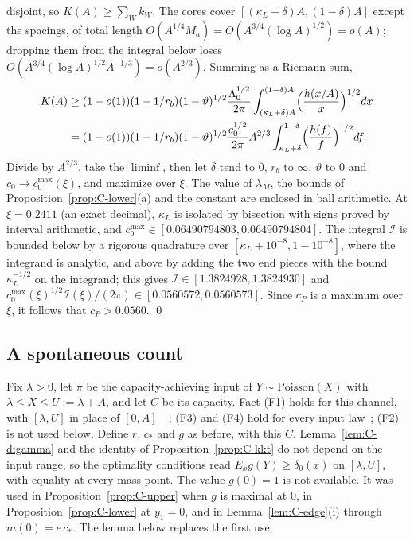 disjoint, so $K(A)\ge\sum_Wk_W$. The cores cover $[(\kappa_L+\delta)A,(1-\delta)A]$ except the spacings, of total length
$O(A^{1/4}M_a)=O(A^{3/4}(\log A)^{1/2})=o(A)$; dropping them from the integral below loses $O(A^{3/4}(\log A)^{1/2}A^{-1/3})=o(A^{2/3})$.
Summing as a Riemann sum,
\begin{align*}
K(A)&\ge(1-o(1))(1-1/r_b)(1-\vartheta)^{1/2}\frac{\Lambda_0^{1/2}}{2\pi}\int_{(\kappa_L+\delta)A}^{(1-\delta)A}\Bigl(\frac{h(x/A)}{x}\Bigr)^{1/2}dx\\
&=(1-o(1))(1-1/r_b)(1-\vartheta)^{1/2}\frac{c_0^{1/2}}{2\pi}A^{2/3}\int_{\kappa_L+\delta}^{1-\delta}\Bigl(\frac{h(f)}{f}\Bigr)^{1/2}df .
\end{align*}
Divide by $A^{2/3}$, take the $\liminf$, then let $\delta$ tend to $0$, $r_b$ to $\infty$, $\vartheta$ to $0$ and $c_0\to c_{0}^{\max}(\xi)$, and maximize
over $\xi$. The value of $\lambda_M$, the bounds of Proposition~\ref{prop:C-lower}(a) and the constant are enclosed in ball
arithmetic. At $\xi=0.2411$ (an exact decimal), $\kappa_L$ is isolated by bisection with signs proved by interval arithmetic, and
$c_{0}^{\max}\in[0.06490794803,0.06490794804]$. The integral $\mathcal I$ is bounded below by a rigorous quadrature over $[\kappa_L+10^{-8},1-10^{-8}]$, where the integrand is analytic, and above by
adding the two end pieces with the bound $\kappa_L^{-1/2}$ on the integrand; this gives $\mathcal I\in[1.3824928,1.3824930]$ and
$c_0^{\max}(\xi)^{1/2}\mathcal I(\xi)/(2\pi)\in[0.0560572,0.0560573]$. Since $c_P$ is a maximum over $\xi$, it follows that $c_P>0.0560$. \qed

\subsection{A spontaneous count}\label{app:C-lam}

Fix $\lambda>0$, let $\pi$ be the capacity-achieving input of $Y\sim\mathrm{Poisson}(X)$ with $\lambda\le X\le U:=\lambda+A$, and let
$C$ be its capacity. Fact (F1) holds for this channel, with $[\lambda,U]$ in place of $[0,A]$~\cite{Shamai1990}~\cite[Lemma~1]{BDS2024};
(F3) and (F4) hold for every input law~\cite[Lemma~3]{BDS2024}; (F2) is not used below. Define $r$, $c_*$ and $g$ as before, with this
$C$. Lemma~\ref{lem:C-digamma} and the identity of Proposition~\ref{prop:C-kkt} do not depend on the input range, so the optimality
conditions read $E_xg(Y)\ge\delta_0(x)$ on $[\lambda,U]$, with equality at every mass point. The value $g(0)=1$ is not available. It was
used in Proposition~\ref{prop:C-upper} when $g$ is maximal at $0$, in Proposition~\ref{prop:C-lower} at $y_1=0$, and in
Lemma~\ref{lem:C-edge}(i) through $m(0)=e\,c_*$. The lemma below replaces the first use.

